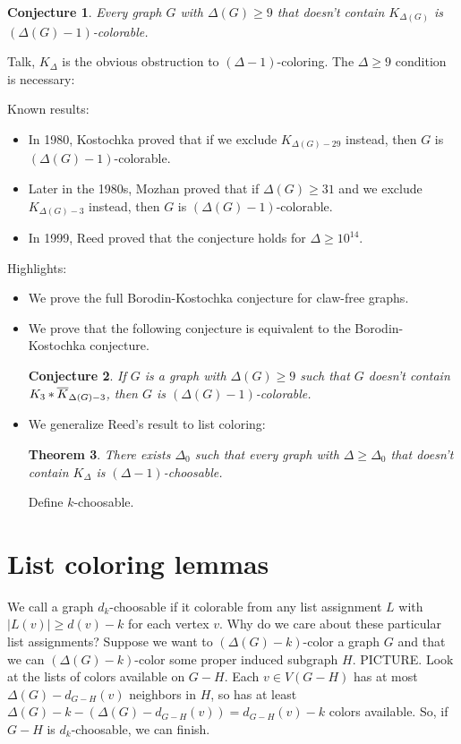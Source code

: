 \documentclass[12pt]{article}
\theoremstyle{plain}
\newtheorem{thm}{Theorem}[section]
\newtheorem{conjecture}[thm]{Conjecture}
\theoremstyle{definition}
\theoremstyle{remark}
\newcommand{\card}[1]{\left|#1\right|}
\newcommand{\join}[2]{#1 \mbox{\hspace{2 pt}$\ast$\hspace{2 pt}} #2}
\begin{document}
\begin{conjecture}
Every graph $G$ with $\Delta(G) \geq 9$ that doesn't contain $K_{\Delta(G)}$ is $(\Delta(G)-1)$-colorable.
\end{conjecture}

Talk, $K_\Delta$ is the obvious obstruction to $(\Delta-1)$-coloring.  The $\Delta \geq 9$ condition is necessary:



\bigskip
\noindent Known results:
\begin{itemize}
\item In 1980, Kostochka proved that if we exclude $K_{\Delta(G)-29}$ instead, then $G$ is $(\Delta(G)-1)$-colorable.
\item Later in the 1980s, Mozhan proved that if $\Delta(G) \geq 31$ and we exclude $K_{\Delta(G)-3}$ instead, then $G$ is $(\Delta(G)-1)$-colorable.
\item In 1999, Reed proved that the conjecture holds for $\Delta \geq 10^{14}$.  
\end{itemize}

\noindent Highlights:
\begin{itemize}
\item We prove the full Borodin-Kostochka conjecture for claw-free graphs.
\item We prove that the following conjecture is equivalent to the Borodin-Kostochka conjecture.
\begin{conjecture}
If $G$ is a graph with $\Delta(G) \geq 9$ such that $G$ doesn't contain $\join{K_3}{\overline{K}_{\Delta(G)-3}}$, then $G$ is $(\Delta(G)-1)$-colorable.
\end{conjecture}
\item We generalize Reed's result to list coloring:

\begin{thm}
There exists $\Delta_0$ such that every graph with $\Delta \geq \Delta_0$ that doesn't contain $K_{\Delta}$ is $(\Delta-1)$-choosable.
\end{thm}

Define $k$-choosable.
\end{itemize}

\section{List coloring lemmas}
We call a graph $d_k$-choosable if it colorable from any list assignment $L$ with $\card{L(v)} \geq d(v) - k$ for each vertex $v$.  Why do we care about these particular list assignments?  Suppose we want to $(\Delta(G) - k)$-color a graph $G$ and that we can $(\Delta(G) - k)$-color some proper induced subgraph $H$.  PICTURE.  Look at the lists of colors available on $G-H$.  Each $v \in V(G-H)$ has at most $\Delta(G) - d_{G-H}(v)$ neighbors in $H$, so has at least $\Delta(G) - k - (\Delta(G) - d_{G-H}(v)) = d_{G-H}(v) - k$ colors available.  So, if $G-H$ is $d_k$-choosable, we can finish.
\end{document}
